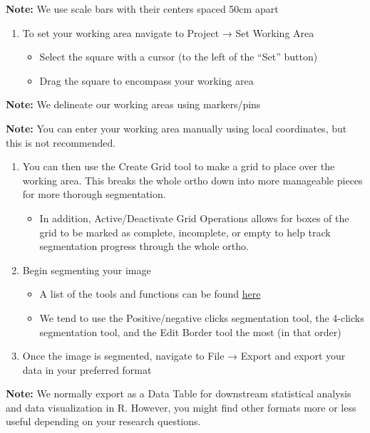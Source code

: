 \documentclass[
]{article}
\providecommand{\tightlist}{%
  \setlength{\itemsep}{0pt}\setlength{\parskip}{0pt}}
\begin{document}
\textbf{Note:} We use scale bars with their centers spaced 50cm apart

\begin{enumerate}
\def\labelenumi{\arabic{enumi}.}
\setcounter{enumi}{2}
\tightlist
\item
  To set your working area navigate to Project → Set Working Area

  \begin{itemize}
  \tightlist
  \item
    Select the square with a cursor (to the left of the ``Set'' button)
  \item
    Drag the square to encompass your working area
  \end{itemize}
\end{enumerate}

\textbf{Note:} We delineate our working areas using markers/pins

\textbf{Note:} You can enter your working area manually using local
coordinates, but this is not recommended.

\begin{enumerate}
\def\labelenumi{\arabic{enumi}.}
\setcounter{enumi}{3}
\tightlist
\item
  You can then use the Create Grid tool to make a grid to place over the
  working area. This breaks the whole ortho down into more manageable
  pieces for more thorough segmentation.

  \begin{itemize}
  \tightlist
  \item
    In addition, Active/Deactivate Grid Operations allows for boxes of
    the grid to be marked as complete, incomplete, or empty to help
    track segmentation progress through the whole ortho.
  \end{itemize}
\item
  Begin segmenting your image

  \begin{itemize}
  \tightlist
  \item
    A list of the tools and functions can be found
    \href{https://taglab.isti.cnr.it/docs}{here}
  \item
    We tend to use the Positive/negative clicks segmentation tool, the
    4-clicks segmentation tool, and the Edit Border tool the most (in
    that order)
  \end{itemize}
\item
  Once the image is segmented, navigate to File → Export and export your
  data in your preferred format
\end{enumerate}

\textbf{Note:} We normally export as a Data Table for downstream
statistical analysis and data visualization in R. However, you might
find other formats more or less useful depending on your research
questions.
\end{document}
